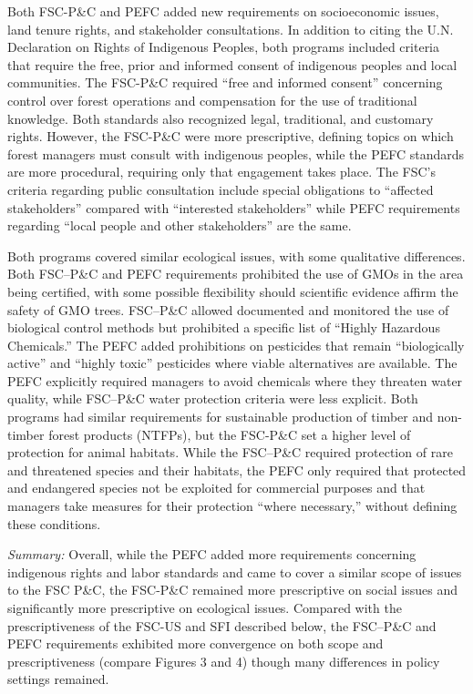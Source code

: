 \documentclass[
      12pt,
            Review ]{article}
\begin{document}
Both FSC-P\&C and PEFC added new requirements on socioeconomic issues, land tenure rights, and stakeholder consultations. In addition to citing the U.N. Declaration on Rights of Indigenous Peoples, both programs included criteria that require the free, prior and informed consent of indigenous peoples and local communities. The FSC-P\&C required ``free and informed consent'' concerning control over forest operations and compensation for the use of traditional knowledge. Both standards also recognized legal, traditional, and customary rights. However, the FSC-P\&C were more prescriptive, defining topics on which forest managers must consult with indigenous peoples, while the PEFC standards are more procedural, requiring only that engagement takes place. The FSC's criteria regarding public consultation include special obligations to ``affected stakeholders'' compared with ``interested stakeholders'' while PEFC requirements regarding ``local people and other stakeholders'' are the same.

Both programs covered similar ecological issues, with some qualitative differences. Both FSC--P\&C and PEFC requirements prohibited the use of GMOs in the area being certified, with some possible flexibility should scientific evidence affirm the safety of GMO trees. FSC--P\&C allowed documented and monitored the use of biological control methods but prohibited a specific list of ``Highly Hazardous Chemicals.'' The PEFC added prohibitions on pesticides that remain ``biologically active'' and ``highly toxic'' pesticides where viable alternatives are available. The PEFC explicitly required managers to avoid chemicals where they threaten water quality, while FSC--P\&C water protection criteria were less explicit. Both programs had similar requirements for sustainable production of timber and non-timber forest products (NTFPs), but the FSC-P\&C set a higher level of protection for animal habitats. While the FSC--P\&C required protection of rare and threatened species and their habitats, the PEFC only required that protected and endangered species not be exploited for commercial purposes and that managers take measures for their protection ``where necessary,'' without defining these conditions.

\emph{Summary:} Overall, while the PEFC added more requirements concerning indigenous rights and labor standards and came to cover a similar scope of issues to the FSC P\&C, the FSC-P\&C remained more prescriptive on social issues and significantly more prescriptive on ecological issues. Compared with the prescriptiveness of the FSC-US and SFI described below, the FSC--P\&C and PEFC requirements exhibited more convergence on both scope and prescriptiveness (compare Figures 3 and 4) though many differences in policy settings remained.
\end{document}
